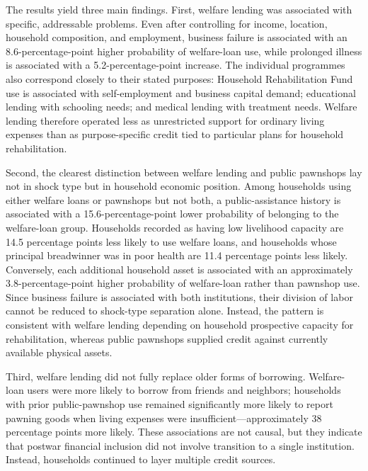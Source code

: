 \documentclass[12pt,a4paper]{article}
\begin{document}
The results yield three main findings. First, welfare lending was associated with specific, addressable problems. Even after controlling for income, location, household composition, and employment, business failure is associated with an 8.6-percentage-point higher probability of welfare-loan use, while prolonged illness is associated with a 5.2-percentage-point increase. The individual programmes also correspond closely to their stated purposes: Household Rehabilitation Fund use is associated with self-employment and business capital demand; educational lending with schooling needs; and medical lending with treatment needs. Welfare lending therefore operated less as unrestricted support for ordinary living expenses than as purpose-specific credit tied to particular plans for household rehabilitation.

Second, the clearest distinction between welfare lending and public pawnshops lay not in shock type but in household economic position. Among households using either welfare loans or pawnshops but not both, a public-assistance history is associated with a 15.6-percentage-point lower probability of belonging to the welfare-loan group. Households recorded as having low livelihood capacity are 14.5 percentage points less likely to use welfare loans, and households whose principal breadwinner was in poor health are 11.4 percentage points less likely. Conversely, each additional household asset is associated with an approximately 3.8-percentage-point higher probability of welfare-loan rather than pawnshop use. Since business failure is associated with both institutions, their division of labor cannot be reduced to shock-type separation alone. Instead, the pattern is consistent with welfare lending depending on household prospective capacity for rehabilitation, whereas public pawnshops supplied credit against currently available physical assets.

Third, welfare lending did not fully replace older forms of borrowing. Welfare-loan users were more likely to borrow from friends and neighbors; households with prior public-pawnshop use remained significantly more likely to report pawning goods when living expenses were insufficient—approximately 38 percentage points more likely. These associations are not causal, but they indicate that postwar financial inclusion did not involve transition to a single institution. Instead, households continued to layer multiple credit sources.
\end{document}
